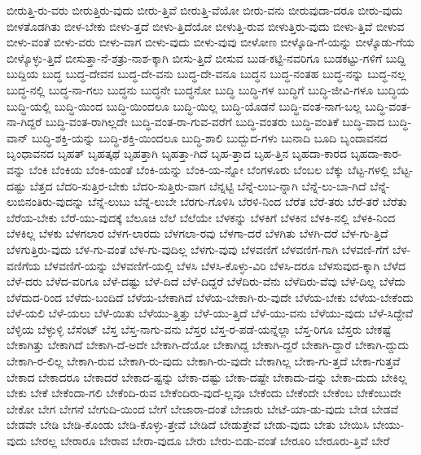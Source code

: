 {ಬೀರುತ್ತಿ-ರು-ವರು
ಬೀರುತ್ತಿರು-ವುದು
ಬೀರು-ತ್ತಿವೆ
ಬೀರುತ್ತಿ-ವೆಯೋ
ಬೀರು-ವನು
ಬೀರುವುದಾ-ದರೂ
ಬೀರು-ವುದು
ಬೀಳತೊಡಗಿತು
ಬೀಳ-ಬೇಕು
ಬೀಳು-ತ್ತದೆ
ಬೀಳು-ತ್ತಿದೆಯೋ
ಬೀಳುತ್ತಿ-ರುವ
ಬೀಳುತ್ತಿರು-ವುದು
ಬೀಳು-ತ್ತಿವೆ
ಬೀಳುವ
ಬೀಳು-ವಂತೆ
ಬೀಳು-ವರು
ಬೀಳು-ವಾಗ
ಬೀಳು-ವುದು
ಬೀಳು-ವುವು
ಬೀಳೋಣ
ಬೀಳ್ಕೊಡಿ-ಗೆ-ಯನ್ನು
ಬೀಳ್ಕೊಡು-ಗೆಯ
ಬೀಳ್ಕೊಳ್ಳು-ತ್ತಿದೆ
ಬೀಸುತ್ತಾ-ನೆ-ಶತ್ರು-ನಾಶ-ಕ್ಕಾಗಿ
ಬೀಸು-ತ್ತಿದೆ
ಬೀಸುವ
ಬುಡ-ಕಟ್ಟಿ-ನವರಿಗೂ
ಬುಡಕಟ್ಟು-ಗಳಿಗೆ
ಬುದ್ದಿ
ಬುದ್ದಿಯ
ಬುದ್ಧ
ಬುದ್ಧ-ದೇವನ
ಬುದ್ಧ-ದೇ-ವನು
ಬುದ್ಧ-ದೇ-ವನೂ
ಬುದ್ಧನ
ಬುದ್ಧ-ನಂತಹ
ಬುದ್ಧ-ನನ್ನು
ಬುದ್ಧ-ನಲ್ಲ
ಬುದ್ಧ-ನಲ್ಲಿ
ಬುದ್ಧ-ನಾ-ಗಲು
ಬುದ್ಧನು
ಬುದ್ಧನೇ
ಬುದ್ಧನೋ
ಬುದ್ಧಿ
ಬುದ್ಧಿ-ಗಳ
ಬುದ್ಧಿಗೆ
ಬುದ್ಧಿ-ಜೀವಿ-ಗಳೂ
ಬುದ್ಧಿಯ
ಬುದ್ಧಿ-ಯಲ್ಲಿ
ಬುದ್ಧಿ-ಯಿಂದ
ಬುದ್ಧಿ-ಯಿಂದಲೂ
ಬುದ್ಧಿ-ಯಿಲ್ಲ
ಬುದ್ಧಿ-ಯೊಡನೆ
ಬುದ್ಧಿ-ವಂತ-ನಾಗ-ಬಲ್ಲ
ಬುದ್ಧಿ-ವಂತ-ನಾ-ಗಿದ್ದರೆ
ಬುದ್ಧಿ-ವಂತ-ರಾಗಿಲ್ಲದೇ
ಬುದ್ಧಿ-ವಂತ-ರಾ-ಗುವ-ವರೆಗೆ
ಬುದ್ಧಿ-ವಂತರು
ಬುದ್ಧಿ-ವಂತಿಕೆ
ಬುದ್ಧಿ-ವಾದ
ಬುದ್ಧಿ-ವಾನ್
ಬುದ್ಧಿ-ಶಕ್ತಿ-ಯನ್ನು
ಬುದ್ಧಿ-ಶಕ್ತಿ-ಯಿಂದಲೂ
ಬುದ್ಧಿ-ಶಾಲಿ
ಬುದ್ಬುದ-ಗಳು
ಬುನಾದಿ
ಬೂದಿ
ಬೃಂದಾವನದ
ಬೃಂಧಾವನದ
ಬೃಹತ್
ಬೃಹತ್ಕಥೆ
ಬೃಹತ್ತಾಗಿ
ಬೃಹತ್ತಾ-ಗಿದೆ
ಬೃಹ-ತ್ತಾದ
ಬೃಹ-ತ್ತಿನ
ಬೃಹದಾ-ಕಾರದ
ಬೃಹದಾ-ಕಾರ-ವನ್ನು
ಬೆಂಕಿ
ಬೆಂಕಿಯ
ಬೆಂಕಿ-ಯಂತೆ
ಬೆಂಕಿ-ಯನ್ನು
ಬೆಂಕಿ-ಯ-ನ್ನೋ
ಬೆಂಗಳೂರು
ಬೆಂಬಲ
ಬೆಕ್ಕು
ಬೆಟ್ಟ-ಗಳಲ್ಲಿ
ಬೆಟ್ಟ-ದಷ್ಟು
ಬೆತ್ತದ
ಬೆದರಿ-ಸುತ್ತಿರ-ಬೇಕು
ಬೆದರಿ-ಸುತ್ತಿರು-ವಾಗ
ಬೆನ್ನಟ್ಟಿ
ಬೆನ್ನೆ-ಲುಬ-ನ್ನಾಗಿ
ಬೆನ್ನೆ-ಲು-ಬಾ-ಗಿದೆ
ಬೆನ್ನೆ-ಲುಬಿನಂತಿರು-ವುದನ್ನು
ಬೆನ್ನೆ-ಲುಬು
ಬೆನ್ನೆ-ಲುಬೇ
ಬೆರಗು-ಗೊಳಿಸಿ
ಬೆರಳಿ-ನಿಂದ
ಬೆರೆತ
ಬೆರೆ-ತರು
ಬೆರೆ-ತರೆ
ಬೆರೆತು
ಬೆರೆಯ-ಬೇಕು
ಬೆರೆ-ಯು-ವುದಕ್ಕೆ
ಬೆಲೂಚಿ
ಬೆಲೆ
ಬೆಲೆಯೇ
ಬೆಳಕನ್ನು
ಬೆಳಕಿಗೆ
ಬೆಳಕಿನ
ಬೆಳಕಿ-ನಲ್ಲಿ
ಬೆಳಕಿ-ನಿಂದ
ಬೆಳಕಿಲ್ಲ
ಬೆಳಕು
ಬೆಳಗಲಾರ
ಬೆಳಗ-ಲಾರದು
ಬೆಳಗಲಾ-ರವು
ಬೆಳಗಾ-ದರೆ
ಬೆಳಗಿತು
ಬೆಳಗಿ-ದರೆ
ಬೆಳ-ಗು-ತ್ತಿದೆ
ಬೆಳಗುತ್ತಿರು-ವುದು
ಬೆಳ-ಗು-ವಂತೆ
ಬೆಳ-ಗು-ವುದಿಲ್ಲ
ಬೆಳಗು-ವುವು
ಬೆಳವಣಿಗೆ
ಬೆಳವಣಿಗೆ-ಗಾಗಿ
ಬೆಳವಣಿ-ಗೆಗೆ
ಬೆಳ-ವಣಿಗೆಯ
ಬೆಳವಣಿಗೆ-ಯನ್ನು
ಬೆಳವಣಿಗೆ-ಯಲ್ಲಿ
ಬೆಳಸಿ
ಬೆಳಸಿ-ಕೊಳ್ಳು-ವಿರಿ
ಬೆಳಸಿ-ದರೂ
ಬೆಳಸುವುದ-ಕ್ಕಾಗಿ
ಬೆಳೆದ
ಬೆಳೆ-ದರು
ಬೆಳೆದ-ವರಿಗೂ
ಬೆಳೆ-ದಷ್ಟು
ಬೆಳೆ-ದಿದೆ
ಬೆಳೆ-ದಿದ್ದರೆ
ಬೆಳೆದಿರು-ವೆನು
ಬೆಳೆದಿರು-ವೆವು
ಬೆಳೆ-ದಿಲ್ಲ
ಬೆಳೆದು
ಬೆಳೆದುದ-ರಿಂದ
ಬೆಳೆದು-ಬಂದಿದೆ
ಬೆಳೆಯ-ಬೇಕಾಗಿದೆ
ಬೆಳೆಯ-ಬೇಕಾಗಿ-ರು-ವುದೇ
ಬೆಳೆಯ-ಬೇಕು
ಬೆಳೆಯ-ಬೇಕೆಂದು
ಬೆಳೆ-ಯಲಿ
ಬೆಳೆ-ಯಲು
ಬೆಳೆ-ಯಿತು
ಬೆಳೆಯು-ತ್ತಿತ್ತು
ಬೆಳೆ-ಯು-ತ್ತಿದೆ
ಬೆಳೆ-ಯು-ವನು
ಬೆಳೆಯು-ವುದು
ಬೆಳೆ-ಸಿದ್ದೇವೆ
ಬೆಳ್ಳಿಯ
ಬೆಳ್ಳುಳ್ಳಿ
ಬೆಸೆಂಟ್
ಬೆಸ್ತ
ಬೆಸ್ತ-ನಾಗು-ವನು
ಬೆಸ್ತರ
ಬೆಸ್ತ-ರ-ಪಡೆ-ಯನ್ನೆಲ್ಲಾ
ಬೆಸ್ತ-ರಿಗೂ
ಬೆಸ್ತರು
ಬೇಕಷ್ಟೆ
ಬೇಕಾಗಿತ್ತು
ಬೇಕಾಗಿದೆ
ಬೇಕಾಗಿ-ದೆ-ಅದೇ
ಬೇಕಾಗಿ-ದೆಯೋ
ಬೇಕಾಗಿದ್ದ
ಬೇಕಾಗಿ-ದ್ದರೆ
ಬೇಕಾಗಿ-ದ್ದಾರೆ
ಬೇಕಾಗಿ-ದ್ದುದು
ಬೇಕಾಗಿ-ರ-ಲಿಲ್ಲ
ಬೇಕಾಗಿ-ರುವ
ಬೇಕಾಗಿ-ರು-ವುದು
ಬೇಕಾಗಿ-ರು-ವುದೇ
ಬೇಕಾಗಿಲ್ಲ
ಬೇಕಾ-ಗು-ತ್ತದೆ
ಬೇಕಾ-ಗುತ್ತವೆ
ಬೇಕಾದ
ಬೇಕಾದರೂ
ಬೇಕಾದರೆ
ಬೇಕಾದ-ಷ್ಟನ್ನು
ಬೇಕಾ-ದಷ್ಟು
ಬೇಕಾ-ದಷ್ಟೇ
ಬೇಕಾದು-ದನ್ನು
ಬೇಕಾ-ದುದು
ಬೇಕಿಲ್ಲ
ಬೇಕು
ಬೇಕೆ
ಬೇಕೆಂದಾ-ಗಲಿ
ಬೇಕೆಂದಿ-ರುವ
ಬೇಕೆಂದಿರು-ವುದೆ-ಲ್ಲವೂ
ಬೇಕೆಂದು
ಬೇಕೆಂದೇ
ಬೇಕೆಂಬ
ಬೇಕೆಂಬುದೇ
ಬೇಕೋ
ಬೇಗ
ಬೇಗನೆ
ಬೇಗುದಿ-ಯಿಂದ
ಬೇಗೆ
ಬೇಜಾರಾ-ದಂತೆ
ಬೇಜಾರು
ಬೇಟೆ-ಯಾ-ಡು-ವುದು
ಬೇಡ
ಬೇಡವೆ
ಬೇಡವೇ
ಬೇಡಿ
ಬೇಡಿ-ಕೊಂಡು
ಬೇಡಿ-ಕೊಳ್ಳು-ತ್ತೇವೆ
ಬೇಡಿದೆ
ಬೇಡುತ್ತೇವೆ
ಬೇಡು-ವುದು
ಬೇತು
ಬೇಯಿಸಿ
ಬೇಯು-ವುದು
ಬೇರಲ್ಲ
ಬೇರಾರೂ
ಬೇರಾವ
ಬೇರಾ-ವುದೂ
ಬೇರು
ಬೇರು-ಬಿಡು-ವಂತೆ
ಬೇರೂರಿ
ಬೇರೂರು-ತ್ತಿವೆ
ಬೇರೆ
}
